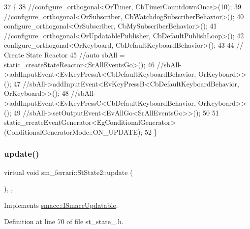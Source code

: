 \begin{DoxyCode}
37         \{
38             \textcolor{comment}{//configure\_orthogonal<OrTimer, CbTimerCountdownOnce>(10);}
39             \textcolor{comment}{//configure\_orthogonal<OrSubscriber, CbWatchdogSubscriberBehavior>();}
40             configure\_orthogonal<OrSubscriber, CbMySubscriberBehavior>();
41             \textcolor{comment}{//configure\_orthogonal<OrUpdatablePublisher, CbDefaultPublishLoop>();}
42             configure\_orthogonal<OrKeyboard, CbDefaultKeyboardBehavior>();
43 
44             \textcolor{comment}{// Create State Reactor}
45             \textcolor{comment}{//auto sbAll = static\_createStateReactor<SrAllEventsGo>();}
46             \textcolor{comment}{//sbAll->addInputEvent<EvKeyPressA<CbDefaultKeyboardBehavior, OrKeyboard>>();}
47             \textcolor{comment}{//sbAll->addInputEvent<EvKeyPressB<CbDefaultKeyboardBehavior, OrKeyboard>>();}
48             \textcolor{comment}{//sbAll->addInputEvent<EvKeyPressC<CbDefaultKeyboardBehavior, OrKeyboard>>();}
49             \textcolor{comment}{//sbAll->setOutputEvent<EvAllGo<SrAllEventsGo>>();}
50 
51             static\_createEventGenerator<EgConditionalGenerator>(ConditionalGeneratorMode::ON\_UPDATE);
52         \}
\end{DoxyCode}
\mbox{\label{structsm__ferrari_1_1StState2_a194e5d2ceacdd173fd2f65f13fbc665d}} 
\subsubsection{\texorpdfstring{update()}{update()}}
{\footnotesize\ttfamily virtual void sm\+\_\+ferrari\+::\+St\+State2\+::update (\begin{DoxyParamCaption}{ }\end{DoxyParamCaption})\hspace{0.3cm}{\ttfamily [inline]}, {\ttfamily [override]}, {\ttfamily [virtual]}}



Implements \hyperlink{classsmacc_1_1ISmaccUpdatable_a84ee0520cbefdb1d412bed54650b028e}{smacc\+::\+I\+Smacc\+Updatable}.



Definition at line 70 of file st\+\_\+state\+\_.\+h.




